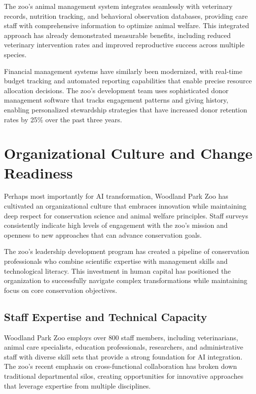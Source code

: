 \documentclass[
  Letterpaper,
]{scrbook}
\begin{document}
The zoo's animal management system integrates seamlessly with veterinary
records, nutrition tracking, and behavioral observation databases,
providing care staff with comprehensive information to optimize animal
welfare. This integrated approach has already demonstrated measurable
benefits, including reduced veterinary intervention rates and improved
reproductive success across multiple species.

Financial management systems have similarly been modernized, with
real-time budget tracking and automated reporting capabilities that
enable precise resource allocation decisions. The zoo's development team
uses sophisticated donor management software that tracks engagement
patterns and giving history, enabling personalized stewardship
strategies that have increased donor retention rates by 25\% over the
past three years.

\section{Organizational Culture and Change
Readiness}\label{organizational-culture-and-change-readiness}

Perhaps most importantly for AI transformation, Woodland Park Zoo has
cultivated an organizational culture that embraces innovation while
maintaining deep respect for conservation science and animal welfare
principles. Staff surveys consistently indicate high levels of
engagement with the zoo's mission and openness to new approaches that
can advance conservation goals.

The zoo's leadership development program has created a pipeline of
conservation professionals who combine scientific expertise with
management skills and technological literacy. This investment in human
capital has positioned the organization to successfully navigate complex
transformations while maintaining focus on core conservation objectives.

\subsection{Staff Expertise and Technical
Capacity}\label{staff-expertise-and-technical-capacity}

Woodland Park Zoo employs over 800 staff members, including
veterinarians, animal care specialists, education professionals,
researchers, and administrative staff with diverse skill sets that
provide a strong foundation for AI integration. The zoo's recent
emphasis on cross-functional collaboration has broken down traditional
departmental silos, creating opportunities for innovative approaches
that leverage expertise from multiple disciplines.
\end{document}
